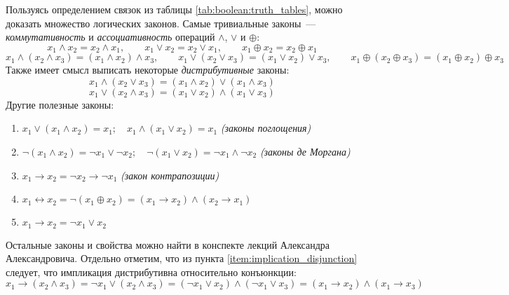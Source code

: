 Пользуясь определением связок из таблицы \ref{tab:boolean:truth_tables}, можно доказать множество логических законов. %
Самые тривиальные законы~--- \textit{коммутативность} и \textit{ассоциативность} операций $ \wedge $, $ \vee $ и $ \oplus $:
\[
    x_1 \wedge x_2 = x_2 \wedge x_1, \qquad
    x_1 \vee x_2   = x_2 \vee x_1, \qquad
    x_1 \oplus x_2 = x_2 \oplus x_1
\]
\[
    x_1 \wedge (x_2 \wedge x_3) = (x_1 \wedge x_2) \wedge x_3, \qquad
    x_1 \vee (x_2 \vee x_3)     = (x_1 \vee x_2) \vee x_3, \qquad
    x_1 \oplus (x_2 \oplus x_3) = (x_1 \oplus x_2) \oplus x_3
\]
Также имеет смысл выписать некоторые \textit{дистрибутивные} законы:
\[
    x_1 \wedge (x_2 \vee x_3) = (x_1 \wedge x_2) \vee (x_1 \wedge x_3)
\]
\[
    x_1 \vee (x_2 \wedge x_3) = (x_1 \vee x_2) \wedge (x_1 \vee x_3)
\]
Другие полезные законы:
\begin{enumerate}[label=\arabic*)]
    \item $ x_1 \vee (x_1 \wedge x_2) = x_1; \quad x_1 \wedge (x_1 \vee x_2) = x_1 $ \hspace*{\fill} \textit{(законы поглощения)}
    \item $ \neg (x_1 \wedge x_2) = \neg x_1 \vee \neg x_2; \quad \neg (x_1 \vee x_2) = \neg x_1 \wedge \neg x_2 $ \hspace*{\fill} \textit{(законы де Моргана)}
    \item $ x_1 \rightarrow x_2 = \neg x_2 \rightarrow \neg x_1 $ \hspace*{\fill} \textit{(закон контрапозиции)}
    \item $ x_1 \leftrightarrow x_2 = \neg (x_1 \oplus x_2) = (x_1 \rightarrow x_2) \wedge (x_2 \rightarrow x_1) $
    \item $ x_1 \to x_2 = \neg x_1 \vee x_2 $ \label{item:implication_disjunction}
\end{enumerate}
Остальные законы и свойства можно найти в конспекте лекций Александра Александровича.
Отдельно отметим, что из пункта \ref{item:implication_disjunction} следует,
что импликация дистрибутивна относительно конъюнкции:
\[
    x_1 \rightarrow (x_2 \wedge x_3) = \neg x_1 \vee (x_2 \wedge x_3) = (\neg x_1 \vee x_2) \wedge (\neg x_1 \vee x_3) = (x_1 \rightarrow x_2) \wedge (x_1 \rightarrow x_3)
\]

